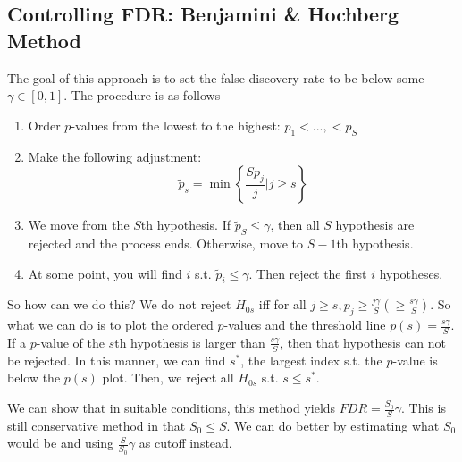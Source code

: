 \documentclass[12pt]{article}
\theoremstyle{definition}
\theoremstyle{property}
\theoremstyle{assumption}
\theoremstyle{example}
\theoremstyle{comment}
\begin{document}
\subsection{Controlling FDR: Benjamini \& Hochberg Method}
The goal of this approach is to set the false discovery rate to be below some $\gamma\in[0,1]$. The procedure is as follows
\begin{enumerate}
\item Order $p$-values from the lowest to the highest: $p_1<...,<p_S$
\item Make the following adjustment:
\[
\tilde{p}_s = \min\left\{\frac{Sp_j}{j}| j\geq s\right\}
\]
\item We move from the $S$th hypothesis. If $\tilde{p}_S\leq \gamma$, then all $S$ hypothesis are rejected and the process ends. Otherwise, move to $S-1$th hypothesis. 
\item At some point, you will find $i$ s.t. $\tilde{p}_i\leq \gamma$. Then reject the first $i$ hypotheses.
\end{enumerate}
\par
So how can we do this? We do not reject $H_{0s}$ iff for all $j\geq s, p_j\geq \frac{j\gamma}{S} \left(\geq\frac{s\gamma}{S}\right)$. So what we can do is to plot the ordered $p$-values and the threshold line $p(s)=\frac{s\gamma}{S}$. If a $p$-value of the $s$th hypothesis is larger than $\frac{s\gamma}{S}$, then that hypothesis can not be rejected. In this manner, we can find $s^*$, the largest index s.t. the $p$-value is below the $p(s)$ plot. Then, we reject all $H_{0s}$ s.t. $s\leq s^*$. \par
We can show that in suitable conditions, this method yields $FDR=\frac{S_0}{S}\gamma$. This is still conservative method in that $S_0\leq S$. We can do better by estimating what $S_0$ would be and using $\frac{S}{S_0}\gamma$ as cutoff instead. 
\end{document}
